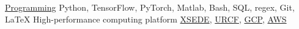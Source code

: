 

\begin{cvskills}

  \cvskill
    {\href{https://github.com/z2e2}{Programming}} %
    {Python, TensorFlow, PyTorch, Matlab, Bash, SQL, regex, Git, \LaTeX} %
 \cvskill
    {High-performance computing platform} %
    {\href{https://www.xsede.org/}{XSEDE}, \href{https://drexel.edu/core-facilities/facilities/research-computing/}{URCF}, \href{https://cloud.google.com/}{GCP},  \href{https://aws.amazon.com/}{AWS}} %

\end{cvskills}
